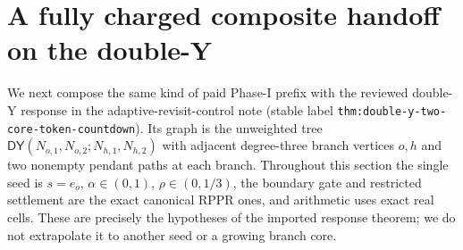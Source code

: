 \section{A fully charged composite handoff on the double-Y}
\label{sec:double-y-composite-handoff}

We next compose the same kind of paid Phase-I prefix with the reviewed
double-Y response in the adaptive-revisit-control note (stable label
\texttt{thm:double-y-two-core-token-countdown}).  Its graph is the unweighted
tree $\mathsf{DY}(N_{o,1},N_{o,2};N_{h,1},N_{h,2})$ with adjacent
degree-three branch vertices $o,h$ and two nonempty pendant paths at each
branch.  Throughout this section the single seed is $s=e_o$,
$\alpha\in(0,1)$, $\rho\in(0,1/3)$, the boundary gate and restricted
settlement are the exact canonical RPPR ones, and arithmetic uses exact real
cells.  These are precisely the hypotheses of the imported response theorem;
we do not extrapolate it to another seed or a growing branch core.


